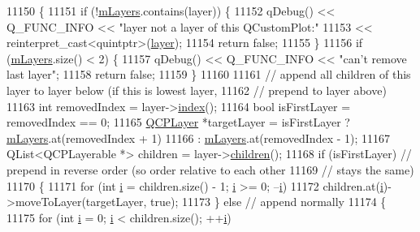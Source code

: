 \begin{DoxyCode}
11150                                              \{
11151   \textcolor{keywordflow}{if} (!\hyperlink{class_q_custom_plot_a9685e7ec1ef5e6066dd7d91bb3a698b3}{mLayers}.contains(layer)) \{
11152     qDebug() << Q\_FUNC\_INFO << \textcolor{stringliteral}{"layer not a layer of this QCustomPlot:"}
11153              << \textcolor{keyword}{reinterpret\_cast<}quintptr\textcolor{keyword}{>}(\hyperlink{class_q_custom_plot_aac492da01782820454e9136a8db28182}{layer});
11154     \textcolor{keywordflow}{return} \textcolor{keyword}{false};
11155   \}
11156   \textcolor{keywordflow}{if} (\hyperlink{class_q_custom_plot_a9685e7ec1ef5e6066dd7d91bb3a698b3}{mLayers}.size() < 2) \{
11157     qDebug() << Q\_FUNC\_INFO << \textcolor{stringliteral}{"can't remove last layer"};
11158     \textcolor{keywordflow}{return} \textcolor{keyword}{false};
11159   \}
11160 
11161   \textcolor{comment}{// append all children of this layer to layer below (if this is lowest layer,}
11162   \textcolor{comment}{// prepend to layer above)}
11163   \textcolor{keywordtype}{int} removedIndex = layer->\hyperlink{class_q_c_p_layer_ad5d7010829a6b99f326b07d7e37c8c99}{index}();
11164   \textcolor{keywordtype}{bool} isFirstLayer = removedIndex == 0;
11165   \hyperlink{class_q_c_p_layer}{QCPLayer} *targetLayer = isFirstLayer ? \hyperlink{class_q_custom_plot_a9685e7ec1ef5e6066dd7d91bb3a698b3}{mLayers}.at(removedIndex + 1)
11166                                        : \hyperlink{class_q_custom_plot_a9685e7ec1ef5e6066dd7d91bb3a698b3}{mLayers}.at(removedIndex - 1);
11167   QList<QCPLayerable *> children = layer->\hyperlink{class_q_c_p_layer_a94c2f0100e48cefad2de8fe0fbb03c27}{children}();
11168   \textcolor{keywordflow}{if} (isFirstLayer) \textcolor{comment}{// prepend in reverse order (so order relative to each other}
11169                     \textcolor{comment}{// stays the same)}
11170   \{
11171     \textcolor{keywordflow}{for} (\textcolor{keywordtype}{int} \hyperlink{_comparision_pictures_2_createtest_image_8m_a6f6ccfcf58b31cb6412107d9d5281426}{i} = children.size() - 1; \hyperlink{_comparision_pictures_2_createtest_image_8m_a6f6ccfcf58b31cb6412107d9d5281426}{i} >= 0; --\hyperlink{_comparision_pictures_2_createtest_image_8m_a6f6ccfcf58b31cb6412107d9d5281426}{i})
11172       children.at(\hyperlink{_comparision_pictures_2_createtest_image_8m_a6f6ccfcf58b31cb6412107d9d5281426}{i})->moveToLayer(targetLayer, \textcolor{keyword}{true});
11173   \} \textcolor{keywordflow}{else} \textcolor{comment}{// append normally}
11174   \{
11175     \textcolor{keywordflow}{for} (\textcolor{keywordtype}{int} \hyperlink{_comparision_pictures_2_createtest_image_8m_a6f6ccfcf58b31cb6412107d9d5281426}{i} = 0; \hyperlink{_comparision_pictures_2_createtest_image_8m_a6f6ccfcf58b31cb6412107d9d5281426}{i} < children.size(); ++\hyperlink{_comparision_pictures_2_createtest_image_8m_a6f6ccfcf58b31cb6412107d9d5281426}{i})

\end{DoxyCode}
